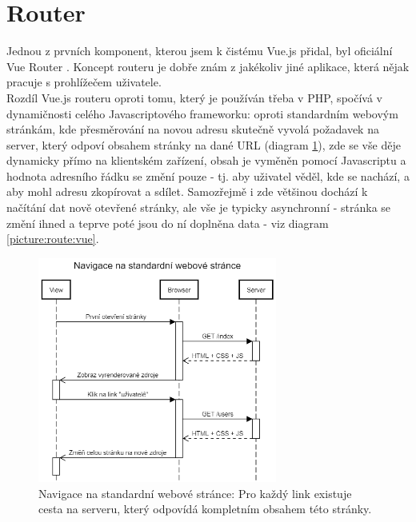 \section{Router}

Jednou z prvních komponent, kterou jsem k čistému Vue.js přidal, byl oficiální Vue Router \cite{vue-router}. Koncept routeru je dobře znám z jakékoliv jiné aplikace, která nějak pracuje s prohlížečem uživatele.\\
Rozdíl Vue.js routeru oproti tomu, který je používán třeba v PHP, spočívá v dynamičnosti celého Javascriptového frameworku: oproti standardním webovým stránkám, kde přesměrování na novou adresu skutečně vyvolá požadavek na server, který odpoví obsahem stránky na dané URL (diagram \ref{picture:route:http}), zde se vše děje dynamicky přímo na klientském zařízení, obsah je vyměněn pomocí Javascriptu a hodnota adresního řádku se změní pouze  - tj. aby uživatel věděl, kde se nachází, a aby mohl adresu zkopírovat a sdílet. Samozřejmě i zde většinou dochází k načítání dat nově otevřené stránky, ale vše je typicky asynchronní - stránka se změní ihned a teprve poté jsou do ní doplněna data - viz diagram \ref{picture:route:vue}.

\begin{figure}[]
\includegraphics[width=0.7\textwidth]{../png/diagrams/sequence-http-navigate.png}
\caption[Navigace na standardní webové stránce]{Navigace na standardní webové stránce: Pro každý link existuje cesta na serveru, který odpovídá kompletním obsahem této stránky.} \label{picture:route:http}
\end{figure}

